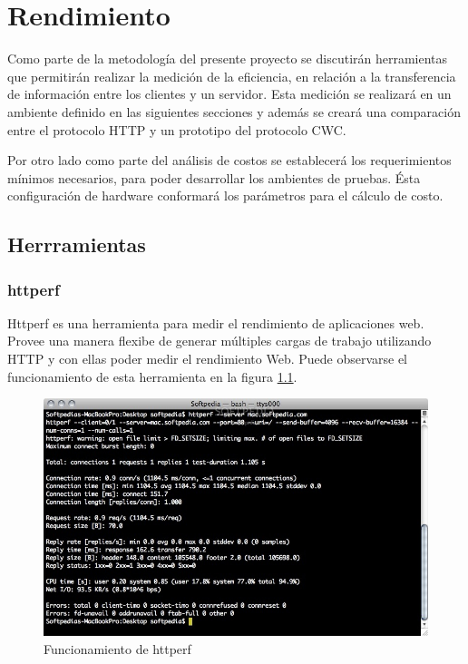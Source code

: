 
\chapter{Rendimiento} %

\label{ch:rendimiento} %

Como parte de la metodología del presente proyecto se discutirán herramientas que permitirán realizar la medición de la eficiencia, en relación a la transferencia de información entre los clientes y un servidor. Esta medición se realizará en un ambiente definido en las siguientes secciones y además se creará una comparación entre el protocolo HTTP y un prototipo del protocolo CWC. 

Por otro lado como parte del análisis de costos se establecerá los requerimientos mínimos necesarios, para poder desarrollar los ambientes de pruebas. Ésta configuración de hardware conformará los parámetros para el cálculo de costo. 


\section{Herrramientas}


\subsection{httperf}

Httperf es una herramienta para medir el rendimiento de aplicaciones web. Provee una manera flexibe de generar múltiples cargas de trabajo utilizando HTTP y con ellas poder medir el rendimiento Web. Puede observarse el funcionamiento de esta herramienta en la figura \ref{httperf}.

\begin{figure}[h]
  \centering
    \includegraphics[scale=0.4]{gfx/httperf}
  \caption{Funcionamiento de httperf}
  \label{httperf}
\end{figure}

